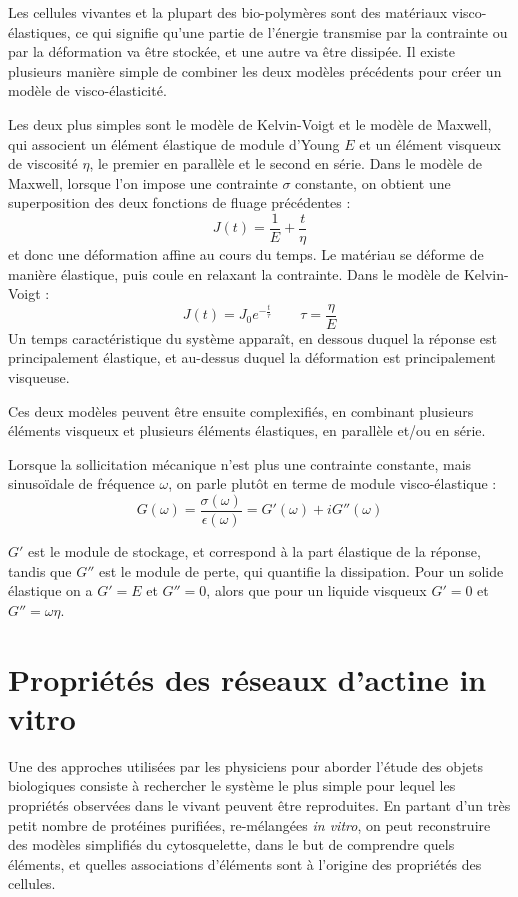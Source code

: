 Les cellules vivantes et la plupart des bio-polymères sont des matériaux visco-élastiques, ce qui signifie qu'une partie de l'énergie transmise par la contrainte ou par la déformation va être stockée, et une autre va être dissipée. Il existe plusieurs manière simple de combiner les deux modèles précédents pour créer un modèle de visco-élasticité. 

Les deux plus simples sont le modèle de Kelvin-Voigt et le modèle de Maxwell, qui associent un élément élastique de module d'Young $E$ et un élément visqueux de viscosité $\eta$, le premier en parallèle et le second en série. 
Dans le modèle de Maxwell, lorsque l'on impose une contrainte $\sigma$ constante, on obtient une superposition des deux fonctions de fluage précédentes : 
$$J(t)=\frac{1}{E} + \frac{t}{\eta}$$ 
et donc une déformation affine au cours du temps. Le matériau se déforme de manière élastique, puis coule en relaxant la contrainte. 
Dans le modèle de Kelvin-Voigt : 
$$ J(t)=J_0 e^{-\frac{t}{\tau}} \qquad \tau=\frac{\eta}{E}$$
Un temps caractéristique du système apparaît, en dessous duquel la réponse est principalement élastique, et au-dessus duquel la déformation est principalement visqueuse. 

Ces deux modèles peuvent être ensuite complexifiés, en combinant plusieurs éléments visqueux et plusieurs éléments élastiques, en parallèle et/ou en série. 

Lorsque la sollicitation mécanique n'est plus une contrainte constante, mais sinusoïdale de fréquence $\omega$, on parle plutôt en terme de module visco-élastique : 
$$G(\omega) = \frac{\sigma(\omega)}{\epsilon(\omega)} = G'(\omega)+iG''(\omega)$$

$G'$ est le module de stockage, et correspond à la part élastique de la réponse, tandis que $G''$ est le module de perte, qui quantifie la dissipation. Pour un solide élastique on a $G'=E$ et $G''=0$, alors que pour un liquide visqueux $G'=0$ et $G''=\omega \eta$. 

\section{Propriétés des réseaux d'actine in vitro}

Une des approches utilisées par les physiciens pour aborder l'étude des objets biologiques consiste à rechercher le système le plus simple pour lequel les propriétés observées dans le vivant peuvent être reproduites. 
En partant d'un très petit nombre de protéines purifiées, re-mélangées \textit{in vitro}, on peut reconstruire des modèles simplifiés du cytosquelette, dans le but de comprendre quels éléments, et quelles associations d'éléments sont à l'origine des propriétés des cellules. 

